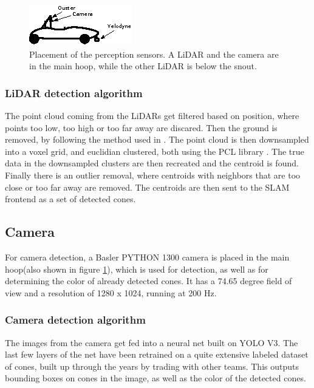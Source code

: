 \begin{figure}
    \centering
    \includegraphics[width=0.8\linewidth]{0_Images/4_Implementation/SensorPlacements.eps}
    \caption[Placement of the perception sensors.]
    {Placement of the perception sensors. A LiDAR and the camera are in the main hoop, while the other LiDAR is below the snout.}
    \label{Fig:SensorPlacementsV2}
\end{figure}

\subsubsection{LiDAR detection algorithm}
The point cloud coming from the LiDARs get filtered based on position, where points too low, too high or too far away are discared. Then the ground is removed, by following the method used in \cite{GroundRemoval}. The point cloud is then downsampled into a voxel grid, and euclidian clustered, both using the PCL library \cite{PCL}. The true data in the downsampled clusters are then recreated and the centroid is found. Finally there is an outlier removal, where centroids with neighbors that are too close or too far away are removed. The centroids are then sent to the SLAM frontend as a set of detected cones.

\subsection{Camera}
For camera detection, a Basler PYTHON 1300 camera is placed in the main hoop(also shown in figure \ref{Fig:SensorPlacementsV2}), which is used for detection, as well as for determining the color of already detected cones. It has a 74.65 degree field of view and a resolution of 1280 x 1024, running at 200 Hz. \\

\subsubsection{Camera detection algorithm}
The images from the camera get fed into a neural net built on YOLO V3\cite{YOLOV3}. The last few layers of the net have been retrained on a quite extensive labeled dataset of cones, built up through the years by trading with other teams. This outputs bounding boxes on cones in the image, as well as the color of the detected cones. \\

